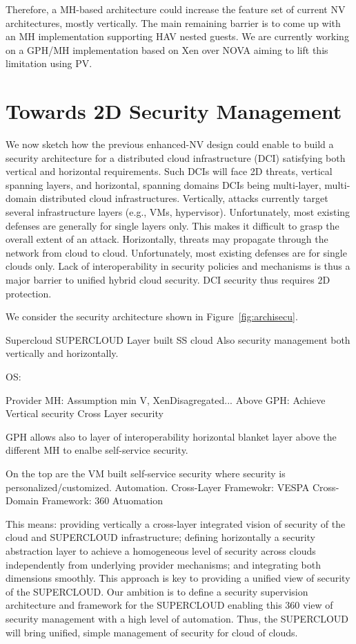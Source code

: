\documentclass{sig-alternate}
\begin{document}
Therefore, a MH-based architecture could increase the feature set of current NV architectures, mostly vertically. The main remaining barrier is to come up with an MH implementation supporting HAV nested guests. We are currently working on a GPH/MH implementation based on Xen over NOVA aiming to lift this limitation using PV.

\section{Towards 2D Security Management}
\label{ref:arch}

\indent We now sketch how the previous enhanced-NV design could enable to build a security architecture for a distributed cloud infrastructure  (DCI) satisfying both vertical and horizontal requirements. Such DCIs will face 2D threats, vertical spanning layers, and horizontal, spanning domains DCIs being multi-layer, multi-domain distributed cloud infrastructures. Vertically, attacks currently target several infrastructure layers (e.g., VMs, hypervisor). Unfortunately, most existing defenses are generally for single layers only. This makes it difficult to grasp the overall extent of an attack. Horizontally, threats may propagate through the network from cloud to cloud. Unfortunately, most existing defenses are for single clouds only. Lack of interoperability in security policies and mechanisms is thus a major barrier to  unified hybrid cloud security. DCI security thus requires 2D protection.

We consider the security architecture shown in Figure~\ref{fig:archisecu}. 

Supercloud
SUPERCLOUD Layer built SS cloud
Also security management both vertically and horizontally.

OS:

Provider MH: Assumption min V, XenDisagregated...
Above GPH: 
Achieve Vertical security Cross Layer security

GPH allows also to layer of interoperability horizontal blanket layer above the different MH to enalbe self-service security.

On the top are the VM built self-service security where security is personalized/customized.
Automation.
Cross-Layer Framewokr: VESPA
Cross-Domain Framework:
360 Atuomation


 This means: providing vertically a cross-layer integrated vision of security of the cloud and SUPERCLOUD infrastructure; defining horizontally a security abstraction layer to achieve a homogeneous level of security across clouds independently from underlying provider mechanisms; and integrating both dimensions smoothly. This approach is key to providing a unified view of security of the SUPERCLOUD.
Our ambition is to define a security supervision architecture and framework for the SUPERCLOUD enabling this 360 view of security management with a high level of automation. Thus, the SUPERCLOUD will bring unified, simple management of security for cloud of clouds. 
\end{document}
